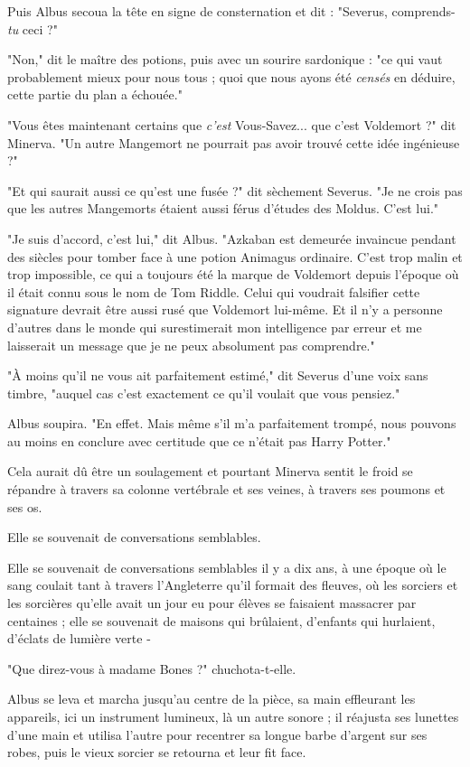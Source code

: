 Puis Albus secoua la tête en signe de consternation et dit : "Severus, comprends-\emph{tu } ceci ?"

"Non," dit le maître des potions, puis avec un sourire sardonique : "ce qui vaut probablement mieux pour nous tous ; quoi que nous ayons été \emph{censés}  en déduire, cette partie du plan a échouée."

"Vous êtes maintenant certains que \emph{c'est}  Vous-Savez... que c'est Voldemort ?" dit Minerva. "Un autre Mangemort ne pourrait pas avoir trouvé cette idée ingénieuse ?"

"Et qui saurait aussi ce qu'est une fusée ?" dit sèchement Severus. "Je ne crois pas que les autres Mangemorts étaient aussi férus d'études des Moldus. C'est lui."

"Je suis d'accord, c'est lui," dit Albus. "Azkaban est demeurée invaincue pendant des siècles pour tomber face à une potion Animagus ordinaire. C'est trop malin et trop impossible, ce qui a toujours été la marque de Voldemort depuis l'époque où il était connu sous le nom de Tom Riddle. Celui qui voudrait falsifier cette signature devrait être aussi rusé que Voldemort lui-même. Et il n'y a personne d'autres dans le monde qui surestimerait mon intelligence par erreur et me laisserait un message que je ne peux absolument pas comprendre."

"À moins qu'il ne vous ait parfaitement estimé," dit Severus d'une voix sans timbre, "auquel cas c'est exactement ce qu'il voulait que vous pensiez."

Albus soupira. "En effet. Mais même s'il m'a parfaitement trompé, nous pouvons au moins en conclure avec certitude que ce n'était pas Harry Potter."

Cela aurait dû être un soulagement et pourtant Minerva sentit le froid se répandre à travers sa colonne vertébrale et ses veines, à travers ses poumons et ses os.

Elle se souvenait de conversations semblables.

Elle se souvenait de conversations semblables il y a dix ans, à une époque où le sang coulait tant à travers l'Angleterre qu'il formait des fleuves, où les sorciers et les sorcières qu'elle avait un jour eu pour élèves se faisaient massacrer par centaines ; elle se souvenait de maisons qui brûlaient, d'enfants qui hurlaient, d'éclats de lumière verte -

"Que direz-vous à madame Bones ?" chuchota-t-elle.

Albus se leva et marcha jusqu'au centre de la pièce, sa main effleurant les appareils, ici un instrument lumineux, là un autre sonore ; il réajusta ses lunettes d'une main et utilisa l'autre pour recentrer sa longue barbe d'argent sur ses robes, puis le vieux sorcier se retourna et leur fit face.

